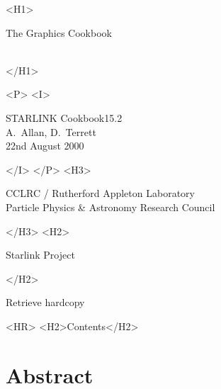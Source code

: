 \documentclass[twoside,11pt]{article}
\newcommand{\stardoccategory}  {STARLINK Cookbook}
\newcommand{\stardocsource}    {sc\stardocnumber}
\newcommand{\stardocnumber}    {15.2}
\newcommand{\stardocauthors}   {A.~Allan, D.~Terrett}
\newcommand{\stardocdate}      {22nd August 2000}
\newcommand{\stardoctitle}     {The Graphics Cookbook}
\newcommand{\htmladdnormallink}[2]{#1}
\newcommand{\htmladdimg}[1]{}
\newcommand{\htmlref}[2]{#1}
\newcommand{\htmladdtonavigation}[1]{}
\newcommand{\xlabel}[1]{}
\newcommand{\latexonlytoc}[0]{\tableofcontents}
\begin{document}
\begin{htmlonly}
   \xlabel{}
   \begin{rawhtml} <H1> \end{rawhtml}
      \stardoctitle\\
      \stardocversion\\
      \stardocmanual
   \begin{rawhtml} </H1> \end{rawhtml}

   \htmladdimg{sc15_cover2.gif}


   \begin{rawhtml} <P> <I> \end{rawhtml}
   \stardoccategory \stardocnumber \\
   \stardocauthors \\
   \stardocdate
   \begin{rawhtml} </I> </P> <H3> \end{rawhtml}
      \htmladdnormallink{CCLRC}{http://www.cclrc.ac.uk} /
      \htmladdnormallink{Rutherford Appleton Laboratory}
                        {http://www.cclrc.ac.uk/ral} \\
      \htmladdnormallink{Particle Physics \& Astronomy Research Council}
                        {http://www.pparc.ac.uk} \\
   \begin{rawhtml} </H3> <H2> \end{rawhtml}
      \htmladdnormallink{Starlink Project}{http://star-www.rl.ac.uk/}
   \begin{rawhtml} </H2> \end{rawhtml}
   \htmladdnormallink{\htmladdimg{source.gif} Retrieve hardcopy}
      {http://star-www.rl.ac.uk/cgi-bin/hcserver?\stardocsource}\\

  \label{stardoccontents}
  \begin{rawhtml} 
    <HR>
    <H2>Contents</H2>
  \end{rawhtml}
  \newcommand{\latexonlytoc}[0]{}

  \section{\xlabel{abstract}Abstract}
\end{htmlonly}
\end{document}
